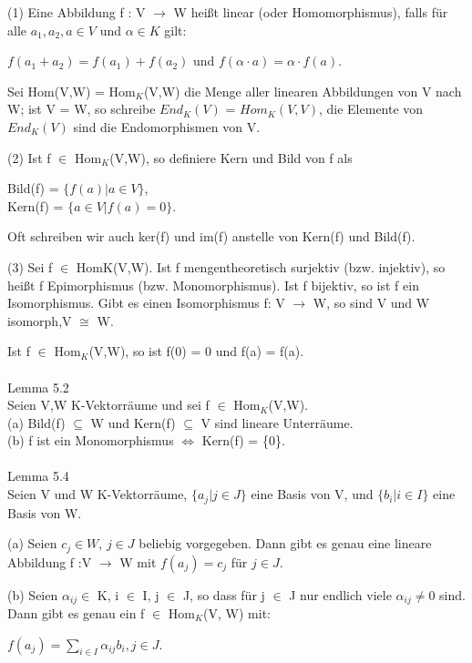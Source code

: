 \documentclass[fontsize=10pt]{scrartcl}
\begin{document}
\begin{compactenum}
\item[(1)] Eine Abbildung f : V $\to$ W heißt linear (oder Homomorphismus), falls für alle $a_1, a_2, a \in V$ und $\alpha \in K$ gilt:
\begin{center}
$f (a_1 + a_2) = f (a_1) + f (a_2)$ und $f (\alpha \cdot a) = \alpha \cdot f (a)$.
\end{center}
Sei Hom(V,W) = Hom$_K$(V,W) die Menge aller linearen Abbildungen von V nach W; ist V = W, so schreibe $End_K(V )$ = $Hom_K(V,V)$, die Elemente von $End_K(V)$ sind die Endomorphismen von V.
\item[(2)] Ist f $\in$ Hom$_K$(V,W), so definiere Kern und Bild von f als
\begin{center}
Bild(f) = $\{ f (a) | a \in V\}$,\\
Kern(f) = $\{ a \in V | f(a) = 0\}$.
\end{center}
Oft schreiben wir auch ker(f) und im(f) anstelle von Kern(f) und Bild(f).
\item[(3)] Sei f $\in$ HomK(V,W). Ist f mengentheoretisch surjektiv (bzw. injektiv), so heißt f Epimorphismus (bzw. Monomorphismus). Ist f bijektiv, so ist f ein Isomorphismus. Gibt es einen Isomorphismus f: V $\to$ W, so sind V und W isomorph,V $\cong$ W.
\end{compactenum}
Ist f $\in$ Hom$_K$(V,W), so ist f(0) = 0 und f(a) = f(a).\\
\\
Lemma 5.2\\
Seien V,W K-Vektorräume und sei f $\in$ Hom$_K$(V,W).\\
(a) Bild(f) $\subseteq$ W und Kern(f) $\subseteq$ V sind lineare Unterräume.\\
(b) f ist ein Monomorphismus $\Leftrightarrow$ Kern(f) = \{0\}.\\
\\
Lemma 5.4\\
Seien V und W K-Vektorräume, $\{a_j | j \in J\}$ eine Basis von V, und $\{b_i | i \in I\}$ eine Basis von W.
\begin{compactenum}
\item[(a)] Seien $c_j \in W$, $j \in J$ beliebig vorgegeben. Dann gibt es genau eine lineare Abbildung f :V $\to$ W mit $f(a_j)=c_j$ für $j \in J$.
\item[(b)]Seien $\alpha_{ij} \in$ K, i $\in$ I, j $\in$ J, so dass für j $\in$ J nur endlich viele $\alpha_{ij} \neq 0$ sind. Dann gibt es genau ein f $\in$ Hom$_K$(V, W) mit:
\begin{center}
$f(a_j) = \sum\nolimits_{i \in I} \alpha_{ij} b_i, j \in J$.
\end{center}
\end{compactenum}
\end{document}
